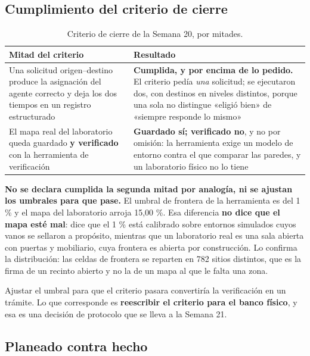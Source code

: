 \documentclass[12pt,letterpaper]{article}
\begin{document}
\subsection{Cumplimiento del criterio de cierre}

\begin{table}[H]
    \centering
    \small
    \caption{Criterio de cierre de la Semana 20, por mitades.}
    \label{tab:cierre}
    \begin{tabular}{@{}p{6.6cm}p{6.6cm}@{}}
        \toprule
        \textbf{Mitad del criterio} & \textbf{Resultado} \\ \midrule
        Una solicitud origen--destino produce la asignación del agente correcto y deja los dos tiempos en un registro estructurado & \textbf{Cumplida, y por encima de lo pedido.} El criterio pedía \emph{una} solicitud; se ejecutaron dos, con destinos en niveles distintos, porque una sola no distingue «eligió bien» de «siempre responde lo mismo» \\ \addlinespace
        El mapa real del laboratorio queda guardado \textbf{y verificado} con la herramienta de verificación & \textbf{Guardado sí; verificado no}, y no por omisión: la herramienta exige un modelo de entorno contra el que comparar las paredes, y un laboratorio físico no lo tiene \\ \bottomrule
    \end{tabular}
\end{table}

\textbf{No se declara cumplida la segunda mitad por analogía, ni se ajustan los umbrales para que pase.} El umbral de frontera de la herramienta es del 1 \% y el mapa del laboratorio arroja 15,00 \%. Esa diferencia \textbf{no dice que el mapa esté mal}: dice que el 1 \% está calibrado sobre entornos simulados cuyos vanos se sellaron a propósito, mientras que un laboratorio real es una sala abierta con puertas y mobiliario, cuya frontera es abierta por construcción. Lo confirma la distribución: las celdas de frontera se reparten en 782 sitios distintos, que es la firma de un recinto abierto y no la de un mapa al que le falta una zona.

Ajustar el umbral para que el criterio pasara convertiría la verificación en un trámite. Lo que corresponde es \textbf{reescribir el criterio para el banco físico}, y esa es una decisión de protocolo que se lleva a la Semana 21.

\subsection{Planeado contra hecho}
\end{document}
